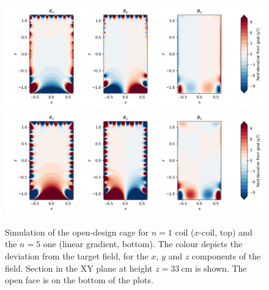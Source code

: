 


\begin{figure}
  \centering
  \includegraphics[width=\linewidth]{gfx/prototype/open_design_Xcoil_field_XY_z0_33.png}
  \includegraphics[width=\linewidth]{gfx/prototype/open_design_n5coil_field_XY_z0_33.png}
  \caption{Simulation of the open-design cage for $n = 1$ coil ($x$-coil, top) and the $n = 5$ one (linear gradient, bottom). The colour depicts the deviation from the target field, for the $x$, $y$ and $z$ components of the field. Section in the XY plane at height $z=\SI{33}{\centi\meter}$ is shown. The open face is on the bottom of the plots. }\label{fig:prototype_open_design_simulation}
\end{figure}

